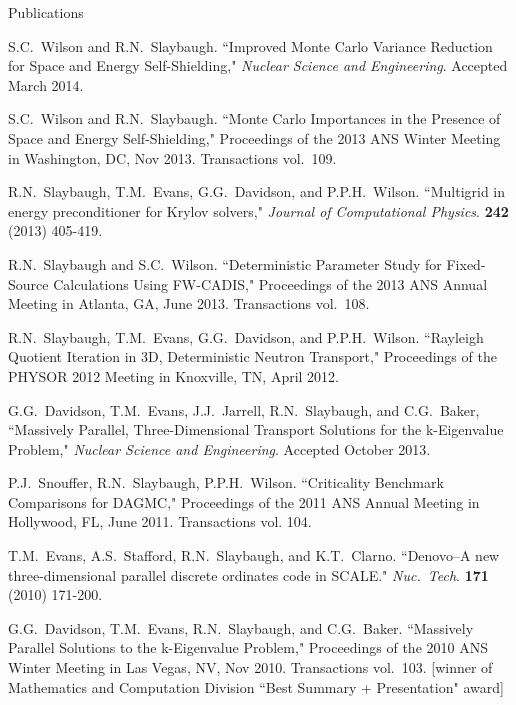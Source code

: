 \documentclass{resume2} %
\begin{document}
\begin{rSection}{Publications}

\begin{bibsection}
\item S.C.\ Wilson and R.N.\ Slaybaugh. ``Improved Monte Carlo Variance Reduction for Space and Energy Self-Shielding," \textit{Nuclear Science and Engineering}. Accepted March 2014.

\item S.C.\ Wilson and R.N.\ Slaybaugh. ``Monte Carlo Importances in the Presence of Space and Energy Self-Shielding," Proceedings of the 2013 ANS Winter Meeting in Washington, DC, Nov 2013. Transactions vol.\ 109.

\item R.N.\ Slaybaugh, T.M.\ Evans, G.G.\ Davidson, and P.P.H.\ Wilson. ``Multigrid in energy preconditioner for Krylov solvers," \textit{Journal of Computational Physics}. \textbf{242} (2013) 405-419.

\item R.N.\ Slaybaugh and  S.C.\ Wilson. ``Deterministic Parameter Study for Fixed-Source Calculations Using FW-CADIS," Proceedings of the 2013 ANS Annual Meeting in Atlanta, GA, June 2013. Transactions vol.\ 108.

\item R.N.\ Slaybaugh, T.M.\ Evans, G.G.\ Davidson, and P.P.H.\ Wilson. ``Rayleigh Quotient Iteration in 3D, Deterministic Neutron Transport," Proceedings of the PHYSOR 2012 Meeting in Knoxville, TN, April 2012.

\item G.G.\ Davidson, T.M.\ Evans, J.J.\ Jarrell, R.N.\ Slaybaugh, and C.G.\ Baker, ``Massively Parallel, Three-Dimensional Transport Solutions for the k-Eigenvalue Problem," \textit{Nuclear Science and Engineering}. Accepted October 2013.

\item P.J.\ Snouffer, R.N.\ Slaybaugh, P.P.H.\ Wilson. ``Criticality Benchmark Comparisons for DAGMC," Proceedings of the 2011 ANS Annual Meeting in Hollywood, FL, June 2011. Transactions vol. 104.

\item T.M.\ Evans, A.S.\ Stafford, R.N.\ Slaybaugh, and K.T.\ Clarno. ``Denovo--A new three-dimensional parallel discrete ordinates code in SCALE." \textit{Nuc.\ Tech}. \textbf{171} (2010) 171-200.

\item G.G.\ Davidson, T.M.\ Evans, R.N.\ Slaybaugh, and C.G.\ Baker.  ``Massively Parallel Solutions to the k-Eigenvalue Problem," Proceedings of the 2010 ANS Winter Meeting in Las Vegas, NV, Nov 2010. Transactions vol.\ 103. [winner of Mathematics and Computation Division ``Best Summary + Presentation" award]


\end{bibsection}
\end{rSection}
\end{document}
